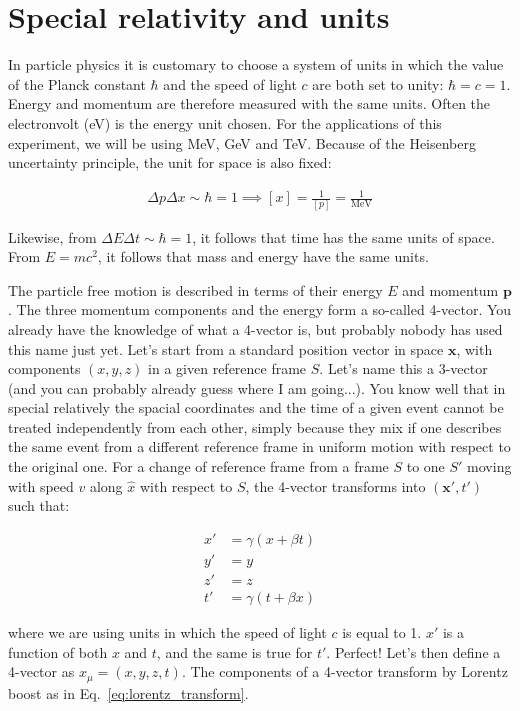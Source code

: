 \section{Special relativity and units}

In particle physics it is customary to choose a system of units in which the value of the Planck constant $\hbar$ and the speed of light $c$ are both set to unity: $\hbar = c = 1$. Energy and momentum are therefore measured with the same units. Often the electronvolt (eV) is the energy unit chosen. For the applications of this experiment, we will be using MeV, GeV and TeV. Because of the Heisenberg uncertainty principle, the unit for space is also fixed: 

\begin{align}
\Delta p \Delta x \sim \hbar = 1 \implies [x] = \frac{1}{[p]}  = \frac{1}{\mathrm{MeV}}
\end{align}

Likewise, from $\Delta E \Delta t \sim \hbar = 1$, it follows that time has the same units of space. From $E=mc^2$, it follows that mass and energy have the same units. 


The particle free motion is described in terms of their energy $E$ and momentum $\mathbf{p}$. The three momentum components and the energy form a so-called 4-vector. You already have the knowledge of what a 4-vector is, but probably nobody has used this name just yet. Let's start from a standard position vector in space $\mathbf{x}$, with components $(x,y,z)$ in a given reference frame $S$. Let's name this a 3-vector (and you can probably already guess where I am going...). You know well that in special relatively the spacial coordinates and the time of a given event cannot be treated independently from each other, simply because they mix if one describes the same event from a different reference frame in uniform motion with respect to the original one.  For a change of reference frame from a frame $S$ to one $S'$ moving with speed $v$ along $\hat{x}$ with respect to $S$, the 4-vector transforms into $(\mathbf{x'},t')$ such that:

\begin{align}
x' &= \gamma \left(x + \beta t\right) \nonumber \\
y' &= y \nonumber \\
z' &= z \nonumber\\
t' &= \gamma \left(t + \beta x\right)
\end{align}
\label{eq:lorentz_transform}

\noindent where we are using units in which the speed of light $c$ is equal to 1. $x'$ is a function of both $x$ and $t$, and the same is true for $t'$.  Perfect! Let's then define a 4-vector as $x_\mu = (x,y,z,t)$. The components of a 4-vector transform by Lorentz boost as in Eq.~\ref{eq:lorentz_transform}.


